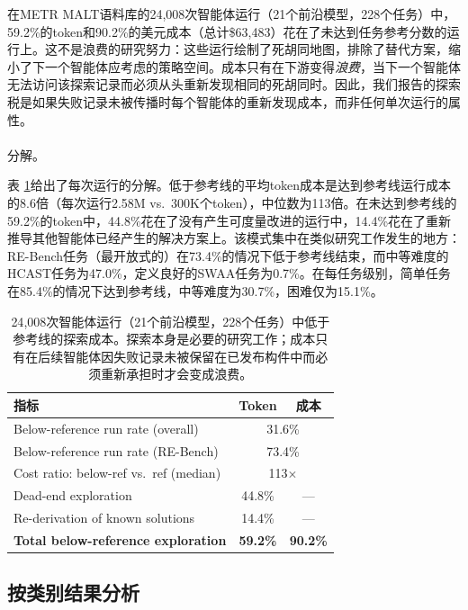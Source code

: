 \documentclass[
]{article}
\makeatletter
\let\oldparagraph\paragraph
\renewcommand{\paragraph}{
    \@ifstar
      \xxxParagraphStar
      \xxxParagraphNoStar
  }
\newcommand{\xxxParagraphStar}[1]{\oldparagraph*{#1}\mbox{}}
\newcommand{\xxxParagraphNoStar}[1]{\oldparagraph{#1}\mbox{}}
\theoremstyle{definition}
\makeatother
\begin{document}
在METR
MALT语料库的24,008次智能体运行（21个前沿模型，228个任务）中，59.2\%的token和90.2\%的美元成本（总计\$63,483）花在了未达到任务参考分数的运行上。这不是浪费的研究努力：这些运行绘制了死胡同地图，排除了替代方案，缩小了下一个智能体应考虑的策略空间。成本只有在下游变得\emph{浪费}，当下一个智能体无法访问该探索记录而必须从头重新发现相同的死胡同时。因此，我们报告的探索税是如果失败记录未被传播时每个智能体的重新发现成本，而非任何单次运行的属性。

\paragraph{分解。}\label{ux5206ux89e3}

表
\ref{tab-exploration-tax}给出了每次运行的分解。低于参考线的平均token成本是达到参考线运行成本的8.6倍（每次运行2.58M
vs.~300K个token），中位数为113倍。在未达到参考线的59.2\%的token中，44.8\%花在了没有产生可度量改进的运行中，14.4\%花在了重新推导其他智能体已经产生的解决方案上。该模式集中在类似研究工作发生的地方：RE-Bench任务（最开放式的）在73.4\%的情况下低于参考线结束，而中等难度的HCAST任务为47.0\%，定义良好的SWAA任务为0.7\%。在每任务级别，简单任务在85.4\%的情况下达到参考线，中等难度为30.7\%，困难仅为15.1\%。

\begin{table}[h]
\centering
\small
\begin{tabular}{lcc}
\toprule
\textbf{指标} & \textbf{Token} & \textbf{成本} \\
\midrule
Below-reference run rate (overall)        & \multicolumn{2}{c}{31.6\%} \\
Below-reference run rate (RE-Bench)       & \multicolumn{2}{c}{73.4\%} \\
Cost ratio: below-ref vs.\ ref (median)   & \multicolumn{2}{c}{113$\times$} \\
Dead-end exploration                       & 44.8\% & --- \\
Re-derivation of known solutions           & 14.4\% & --- \\
\textbf{Total below-reference exploration} & \textbf{59.2\%} & \textbf{90.2\%} \\
\bottomrule
\end{tabular}
\caption{24{,}008次智能体运行（21个前沿模型，228个任务）中低于参考线的探索成本。探索本身是必要的研究工作；成本只有在后续智能体因失败记录未被保留在已发布构件中而必须重新承担时才会变成浪费。}
\label{tab-exploration-tax}
\end{table}

\subsection{按类别结果分析}\label{sec-app-understanding-per-category}
\end{document}
